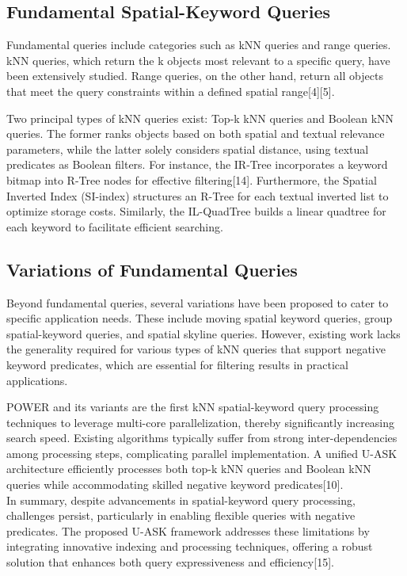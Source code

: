 \documentclass[conference]{IEEEtran}
\begin{document}
\subsection{\textbf{Fundamental Spatial-Keyword Queries}}
Fundamental queries include categories such as kNN queries and range queries. kNN queries, which return the k objects most relevant to a specific query, have been extensively studied. Range queries, on the other hand, return all objects that meet the query constraints within a defined spatial range[4][5].

Two principal types of kNN queries exist: Top-k kNN queries and Boolean kNN queries. The former ranks objects based on both spatial and textual relevance parameters, while the latter solely considers spatial distance, using textual predicates as Boolean filters. For instance, the IR-Tree incorporates a keyword bitmap into R-Tree nodes for effective filtering[14]. Furthermore, the Spatial Inverted Index (SI-index) structures an R-Tree for each textual inverted list to optimize storage costs. Similarly, the IL-QuadTree builds a linear quadtree for each keyword to facilitate efficient searching.

\subsection{\textbf{Variations of Fundamental Queries}}
Beyond fundamental queries, several variations have been proposed to cater to specific application needs. These include moving spatial keyword queries, group spatial-keyword queries, and spatial skyline queries. However, existing work lacks the generality required for various types of kNN queries that support negative keyword predicates, which are essential for filtering results in practical applications.

POWER and its variants are the first kNN spatial-keyword query processing techniques to leverage multi-core parallelization, thereby significantly increasing search speed. Existing algorithms typically suffer from strong inter-dependencies among processing steps, complicating parallel implementation. A unified U-ASK architecture efficiently processes both top-k kNN queries and Boolean kNN queries while accommodating skilled negative keyword predicates[10].\\

In summary, despite advancements in spatial-keyword query processing, challenges persist, particularly in enabling flexible queries with negative predicates. The proposed U-ASK framework addresses these limitations by integrating innovative indexing and processing techniques, offering a robust solution that enhances both query expressiveness and efficiency[15].
\end{document}
